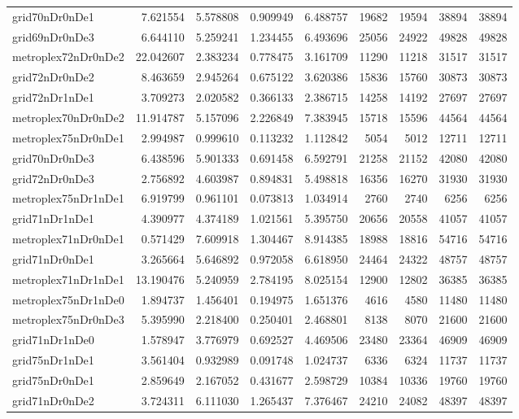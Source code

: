 \begin{longtable}{|l|r|r|r|r|r|r|r|r|}
grid70nDr0nDe1 & 7.621554 & 5.578808 & 0.909949 & 6.488757 & 19682 & 19594 & 38894 & 38894 \\
grid69nDr0nDe3 & 6.644110 & 5.259241 & 1.234455 & 6.493696 & 25056 & 24922 & 49828 & 49828 \\
metroplex72nDr0nDe2 & 22.042607 & 2.383234 & 0.778475 & 3.161709 & 11290 & 11218 & 31517 & 31517 \\
grid72nDr0nDe2 & 8.463659 & 2.945264 & 0.675122 & 3.620386 & 15836 & 15760 & 30873 & 30873 \\
grid72nDr1nDe1 & 3.709273 & 2.020582 & 0.366133 & 2.386715 & 14258 & 14192 & 27697 & 27697 \\
metroplex70nDr0nDe2 & 11.914787 & 5.157096 & 2.226849 & 7.383945 & 15718 & 15596 & 44564 & 44564 \\
metroplex75nDr0nDe1 & 2.994987 & 0.999610 & 0.113232 & 1.112842 & 5054 & 5012 & 12711 & 12711 \\
grid70nDr0nDe3 & 6.438596 & 5.901333 & 0.691458 & 6.592791 & 21258 & 21152 & 42080 & 42080 \\
grid72nDr0nDe3 & 2.756892 & 4.603987 & 0.894831 & 5.498818 & 16356 & 16270 & 31930 & 31930 \\
metroplex75nDr1nDe1 & 6.919799 & 0.961101 & 0.073813 & 1.034914 & 2760 & 2740 & 6256 & 6256 \\
grid71nDr1nDe1 & 4.390977 & 4.374189 & 1.021561 & 5.395750 & 20656 & 20558 & 41057 & 41057 \\
metroplex71nDr0nDe1 & 0.571429 & 7.609918 & 1.304467 & 8.914385 & 18988 & 18816 & 54716 & 54716 \\
grid71nDr0nDe1 & 3.265664 & 5.646892 & 0.972058 & 6.618950 & 24464 & 24322 & 48757 & 48757 \\
metroplex71nDr1nDe1 & 13.190476 & 5.240959 & 2.784195 & 8.025154 & 12900 & 12802 & 36385 & 36385 \\
metroplex75nDr1nDe0 & 1.894737 & 1.456401 & 0.194975 & 1.651376 & 4616 & 4580 & 11480 & 11480 \\
metroplex75nDr0nDe3 & 5.395990 & 2.218400 & 0.250401 & 2.468801 & 8138 & 8070 & 21600 & 21600 \\
grid71nDr1nDe0 & 1.578947 & 3.776979 & 0.692527 & 4.469506 & 23480 & 23364 & 46909 & 46909 \\
grid75nDr1nDe1 & 3.561404 & 0.932989 & 0.091748 & 1.024737 & 6336 & 6324 & 11737 & 11737 \\
grid75nDr0nDe1 & 2.859649 & 2.167052 & 0.431677 & 2.598729 & 10384 & 10336 & 19760 & 19760 \\
grid71nDr0nDe2 & 3.724311 & 6.111030 & 1.265437 & 7.376467 & 24210 & 24082 & 48397 & 48397 \\

\end{longtable}
